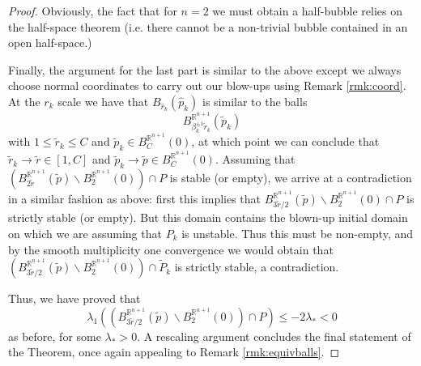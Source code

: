\documentclass[10pt]{article}
\theoremstyle{definition}\newtheorem{definition}[thm]{Definition}
\numberwithin{equation}{section}
\newcommand{\R}{\mathbb{R}}\newcommand{\C}{\mathbb{C}}\newcommand{\N}{\mathbb{N}}
\begin{document}
\begin{proof}
        	 		Obviously, the fact that for $n=2$ we must obtain a half-bubble relies on the half-space theorem \cite{HM90} (i.e. there cannot be a non-trivial bubble contained in an open half-space.)
        	 		
        	 		Finally, the argument for the last part is similar to the above except we always choose normal coordinates to carry out our blow-ups using Remark \ref{rmk:coord}. At the $r_k$ scale we have that $B_{\widehat{r}_k}(\widehat{p}_k)$ is similar to the balls 
        	 		$$B^{\R^{n+1}}_{\beta_k^{\pm 1}\widetilde{r}_k}(\widetilde{p}_k)$$ with $1\leqslant \widetilde{r}_k \leqslant C$ and $\widetilde{p}_k\in B^{\R^{n+1}}_C(0)$, at which point we can conclude that $\widetilde{r}_k \to \widetilde{r}\in [1,C]$ and $\widetilde{p}_k \to \widetilde{p}\in B^{\R^{n+1}}_C(0)$.    
        	 		Assuming that $(B^{\R^{n+1}}_{2\widetilde{r}}(\widetilde{p})\smallsetminus B^{\R^{n+1}}_2(0))\cap P$ is stable (or empty), we arrive at a contradiction in a similar fashion as above: first this implies that $B_{3\widetilde{r}/2}^{\R^{n+1}}(\widetilde{p})\smallsetminus B_2^{\R^{n+1}}(0)\cap P$ is strictly stable (or empty). But this domain contains the blown-up initial domain on which we are assuming that $P_k$ is unstable. Thus this must be non-empty, and by the smooth multiplicity one convergence we would obtain that $(B_{3\widetilde{r}/2}^{\R^{n+1}}(\widetilde{p})\smallsetminus B_2^{\R^{n+1}}(0))\cap \widetilde{P}_k$ is strictly stable, a contradiction. 
        	 		
        	 		Thus, we have proved that $$\lambda_1 ((B^{\R^{n+1}}_{3\widetilde{r}/2}(\widetilde{p})\smallsetminus B^{\R^{n+1}}_2(0))\cap P)\leqslant -2\lambda_{\ast}<0 $$ as before, for some $\lambda_{\ast}>0$. A rescaling argument concludes the final statement of the Theorem, once again appealing to Remark \ref{rmk:equivballs}.         
        	 \end{proof}
        	 	
        	 	
        	 	
\end{document}
